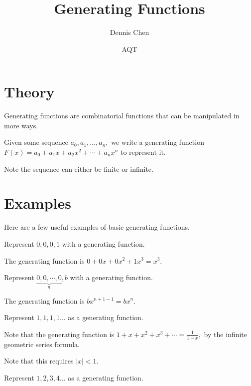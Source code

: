 \documentclass{article}
\title{Generating Functions}
\author{Dennis Chen}
\date{AQT}
\begin{document}
\maketitle

\section{Theory}
Generating functions are combinatorial functions that can be manipulated in more ways. 

\begin{theo}
Given some sequence $a_0,a_1,\dots,a_n,$ we write a generating function $F(x)=a_0+a_1x+a_2x^2+\cdots+a_nx^n$ to represent it.
\end{theo}
Note the sequence can either be finite or infinite.
\section{Examples}
Here are a few useful examples of basic generating functions.
\begin{exam}
Represent $0,0,0,1$ with a generating function.
\end{exam}

\begin{sol}
The generating function is $0+0x+0x^2+1x^3=x^3.$
\end{sol}

\begin{exam}
Represent $\underbrace{0,0,\cdots,0}_{n},b$ with a generating function.
\end{exam}

\begin{sol}
The generating function is $bx^{n+1-1}=bx^n.$
\end{sol}

\begin{exam}
Represent $1,1,1,1\dots$ as a generating function.
\end{exam}

\begin{sol}
Note that the generating function is $1+x+x^2+x^3+\cdots=\frac{1}{1-x},$ by the infinite geometric series formula.
\end{sol}
Note that this requires $|x|<1.$

\begin{exam}
Represent $1,2,3,4\dots$ as a generating function.
\end{exam}
\end{document}
